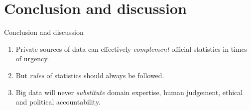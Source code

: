 \documentclass[
  ignorenonframetext,
  aspectratio=54,
]{beamer}
\providecommand{\tightlist}{%
  \setlength{\itemsep}{0pt}\setlength{\parskip}{0pt}}
\begin{document}
\hypertarget{conclusion-and-discussion}{%
\section{Conclusion and discussion}\label{conclusion-and-discussion}}

\begin{frame}{Conclusion and discussion}
\protect\hypertarget{conclusion-and-discussion-1}{}
\begin{enumerate}
\tightlist
\item
  Private sources of data can effectively \emph{complement} official
  statistics in times of urgency.
\item
  But \emph{rules} of statistics should always be followed.
\item
  Big data will never \emph{substitute} domain expertise, human
  judgement, ethical and political accountability.
\end{enumerate}
\end{frame}
\end{document}
